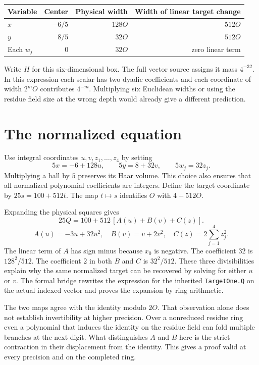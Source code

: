 \documentclass[12pt,letterpaper]{article}
\newcommand{\id}[1]{{\small\nolinkurl{#1}}}
\begin{document}
\begin{center}\small\begin{tabular}{@{}lrrr@{}}\toprule
Variable & Center & Physical width & Width of linear target change\\\midrule
$x$ & $-6/5$ & $128O$ & $512O$\\
$y$ & $8/5$ & $32O$ & $512O$\\
Each $w_j$ & $0$ & $32O$ & zero linear term\\\bottomrule
\end{tabular}\end{center}
Write $H$ for this six-dimensional box. The full vector source assigns it mass $4^{-32}$. In this expression each scalar has two dyadic coefficients and each coordinate of width $2^mO$ contributes $4^{-m}$. Multiplying six Euclidean widths or using the residue field size at the wrong depth would already give a different prediction.

\section{The normalized equation}
Use integral coordinates $u,v,z_1,\ldots,z_4$ by setting
\[
 5x=-6+128u,\qquad 5y=8+32v,\qquad 5w_j=32z_j.
\]
Multiplying a ball by $5$ preserves its Haar volume. This choice also ensures that all normalized polynomial coefficients are integers. Define the target coordinate by $25s=100+512t$. The map $t\mapsto s$ identifies $O$ with $4+512O$.

Expanding the physical squares gives
\[
  25Q=100+512\,[A(u)+B(v)+C(z)].\]
\[
  A(u)=-3u+32u^2,\quad B(v)=v+2v^2,\quad C(z)=2\sum_{j=1}^4z_j^2.
\]
The linear term of $A$ has sign minus because $x_0$ is negative. The coefficient $32$ is $128^2/512$. The coefficient $2$ in both $B$ and $C$ is $32^2/512$. These three divisibilities explain why the same normalized target can be recovered by solving for either $u$ or $v$. The formal bridge rewrites the expression for the inherited \id{TargetOne.Q} on the actual indexed vector and proves the expansion by ring arithmetic.

The two maps agree with the identity modulo $2O$. That observation alone does not establish invertibility at higher precision. Over a nonreduced residue ring even a polynomial that induces the identity on the residue field can fold multiple branches at the next digit. What distinguishes $A$ and $B$ here is the strict contraction in their displacement from the identity. This gives a proof valid at every precision and on the completed ring.
\end{document}
